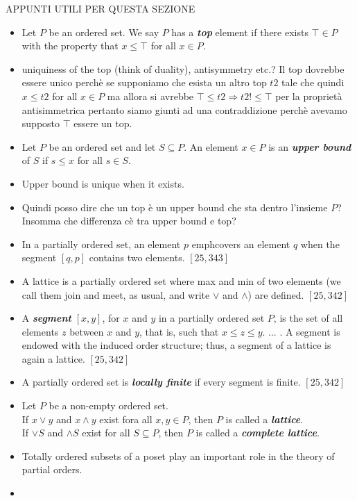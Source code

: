 APPUNTI UTILI PER QUESTA SEZIONE
\begin{itemize}
  \item Let $P$ be an ordered set. We say $P$ has a \emph{\bf{top}} element if there exists $\top \in P$ with the property that $x \le \top$ for all $x \in P$.
  \item uniquiness of the top (think of duality), antisymmetry etc.? Il top dovrebbe essere unico perch\`e se supponiamo che esista un altro top $t2$ tale che quindi $x \le t2$ for all $x \in P$ ma allora si avrebbe $\top \le t2 \Rightarrow t2 !\le \top$ per la propriet\`a antisimmetrica pertanto siamo giunti ad una contraddizione perch\`e avevamo supposto $\top$ essere un top. 
  \item Let $P$ be an ordered set and let $S \subseteq P$. An element $x \in P$ is an \emph{\bf{upper bound}} of $S$ if $s \le x$ for all $s \in S$.
  \item Upper bound is unique when it exists.
  \item Quindi posso dire che un top \`e un upper bound che sta dentro l'insieme $P$? Insomma che differenza c\`e tra upper bound e top?
  
  \item In a partially ordered set, an element $p$ emph{covers} an element $q$ when the segment $[q,p]$ contains two elements. $[25, 343]$
  
  \item A lattice is a partially ordered set where max and min of two elements (we call them join and meet, as usual, and write $\vee$ and $\wedge$) are defined. $[25, 342]$
  
  \item A \emph{\bf{segment}} $[x,y]$, for $x$ and $y$ in a partially ordered set $P$, is the set of all elements $z$ between $x$ and $y$, that is, such that $x \le z \le y$. ... . A segment is endowed with the induced order structure; thus, a segment of a lattice is again a lattice. $[25, 342]$
  
  \item A partially ordered set is \emph{\bf{locally finite}} if every segment is finite. $[25, 342]$
  
  \item Let $P$ be a non-empty ordered set. \\
        If $x \vee y$ and $x \wedge y$ exist fora all $x, y \in P$, then $P$ is called a \emph{\bf{lattice}}. \\
        If $\vee S$ and $\wedge S$ exist for all $S \subseteq P$, then $P$ is called a \emph{\bf{complete lattice}}.
        
  \item Totally ordered subsets of a poset play an important role in the theory of partial orders.
  
  \item 
\end{itemize}

